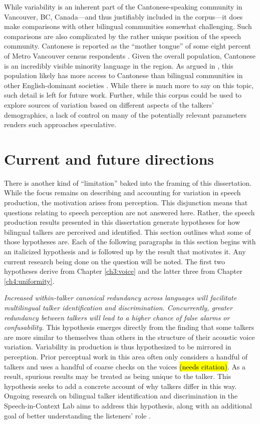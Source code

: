 While variability is an inherent part of the Cantonese-speaking community in Vancouver, BC, Canada---and thus justifiably included in the corpus---it does make comparisons with other bilingual communities somewhat challenging. Such comparisons are also complicated by the rather unique position of the speech community. Cantonese is reported as the ``mother tongue'' of some eight percent of Metro Vancouver census respondents \citep{statistics_2017_proportion}. Given the overall population, Cantonese is an incredibly visible minority language in the region. As argued in \citet{chan_2020_lexically}, this population likely has more access to Cantonese than bilingual communities in other English-dominant societies \citep[e.g.,][]{bruggeman_2019_l1}. While there is much more to say on this topic, such detail is left for future work. Further, while this corpus could be used to explore sources of variation based on different aspects of the talkers' demographics, a lack of control on many of the potentially relevant parameters renders such approaches speculative. 

\section{Current and future directions}\label{ch5:sec:directions}

There is another kind of ``limitation'' baked into the framing of this dissertation. While the focus remains on describing and accounting for variation in speech production, the motivation arises from perception. This disjunction means that questions relating to speech perception are not answered here. Rather, the speech production results presented in this dissertation generate hypotheses for how bilingual talkers are perceived and identified. This section outlines what some of those hypotheses are. Each of the following paragraphs in this section begins with an italicized hypothesis and is followed up by the result that motivates it. Any current research being done on the question will be noted. The first two hypotheses derive from Chapter \ref{ch3:voice} and the latter three from Chapter \ref{ch4:uniformity}.

\textit{Increased within-talker canonical redundancy across languages will facilitate multilingual talker identification and discrimination. Concurrently, greater redundancy between talkers will lead to a higher chance of false alarms or confusability.} This hypothesis emerges directly from the finding that some talkers are more similar to themselves than others in the structure of their acoustic voice variation. Variability in production is thus hypothesized to be mirrored in perception. Prior perceptual work in this area often only considers a handful of talkers and uses a handful of coarse checks on the voices \hl{(needs citation)}. As a result, spurious results may be treated as being unique to the talker. This hypothesis seeks to add a concrete account of why talkers differ in this way. Ongoing research on bilingual talker identification and discrimination in the Speech-in-Context Lab aims to address this hypothesis, along with an additional goal of better understanding the listeners' role \citep{lloy_2020_bilingual, lloy_2021_examining}.

